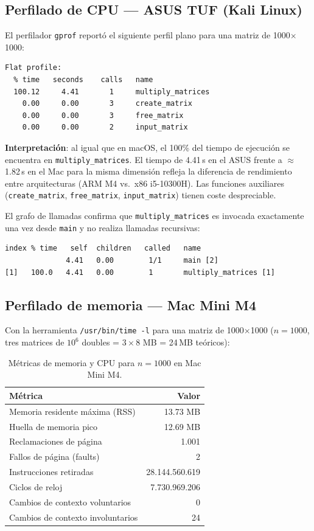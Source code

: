 \documentclass{article}
\begin{document}
\subsection{Perfilado de CPU --- ASUS TUF (Kali Linux)}

El perfilador \texttt{gprof} reportó el siguiente perfil plano para una matriz de 1000$\times$1000:

\begin{lstlisting}
Flat profile:
  % time   seconds    calls   name
  100.12     4.41       1     multiply_matrices
    0.00     0.00       3     create_matrix
    0.00     0.00       3     free_matrix
    0.00     0.00       2     input_matrix
\end{lstlisting}

\textbf{Interpretación}: al igual que en macOS, el 100\% del tiempo de ejecución se encuentra en \texttt{multiply\_matrices}. El tiempo de 4.41\,s en el ASUS frente a $\approx$1.82\,s en el Mac para la misma dimensión refleja la diferencia de rendimiento entre arquitecturas (ARM M4 vs.\ x86 i5-10300H). Las funciones auxiliares (\texttt{create\_matrix}, \texttt{free\_matrix}, \texttt{input\_matrix}) tienen coste despreciable.

El grafo de llamadas confirma que \texttt{multiply\_matrices} es invocada exactamente una vez desde \texttt{main} y no realiza llamadas recursivas:

\begin{lstlisting}
index % time   self  children   called   name
              4.41   0.00        1/1     main [2]
[1]   100.0   4.41   0.00        1       multiply_matrices [1]
\end{lstlisting}

\subsection{Perfilado de memoria --- Mac Mini M4}

Con la herramienta \texttt{/usr/bin/time -l} para una matriz de 1000$\times$1000 ($n=1000$, tres matrices de $10^6$ doubles = $3 \times 8$ MB = 24\,MB teóricos):

\begin{table}[H]
\centering
\begin{tabular}{lr}
\toprule
\textbf{Métrica} & \textbf{Valor} \\
\midrule
Memoria residente máxima (RSS) & 13.73 MB \\
Huella de memoria pico & 12.69 MB \\
Reclamaciones de página & 1.001 \\
Fallos de página (faults) & 2 \\
Instrucciones retiradas & 28.144.560.619 \\
Ciclos de reloj & 7.730.969.206 \\
Cambios de contexto voluntarios & 0 \\
Cambios de contexto involuntarios & 24 \\
\bottomrule
\end{tabular}
\caption{Métricas de memoria y CPU para $n=1000$ en Mac Mini M4.}
\label{tab:mem_mac}
\end{table}
\end{document}

